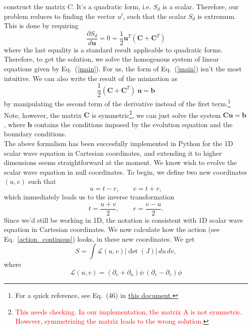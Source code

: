 \documentclass[nofootinbib,preprintnumbers,superscriptaddress,notitlepage]{revtex4-1}
\newcommand{\<}{\begin{equation}}
\newcommand{\?}{\end{equation}}
\begin{document}
construct the matrix $C$. It's a quadratic form, i.e. $S_d$ is a scalar.
Therefore, our problem reduces to finding the vector $u^l$, such that the
scalar $S_d$ is extremum. This is done by requiring
\begin{equation}
\label{main}
\dfrac{\partial S_d}{d\mathbf{u}} = 0 = \dfrac{1}{2}\mathbf{u}^T (\mathbf{C} + \mathbf{C}^T)
\end{equation}
where the last equality is a standard result applicable to quadratic forms.
Therefore, to get the solution, we solve the homogenous system of linear
equations given by Eq.~(\ref{main}). For us, the form of Eq.~(\ref{main})
isn't the most intuitive. We can also write the result of the minization as
\begin{equation}
\label{solve}
\dfrac{1}{2}(\mathbf{C} + \mathbf{C}^T)~\mathbf{u} = \mathbf{b} 
\end{equation}
by manipulating the second term of the derivative instead of the first
term.\footnote{For a quick reference, see Eq.~(46) in
\href{http://www.atmos.washington.edu/~dennis/MatrixCalculus.pdf}{this
document.}} Note, however, the matrix $\mathbf{C}$ is
symmetric\footnote{\textcolor{red}{This needs checking. In our implementation,
the matrix A is not symmetric. However, symmetrizing the matrix leads to the
wrong solution.}}, we can just solve the system $\mathbf{C}\mathbf{u} =
\mathbf{b}  $, where $\mathbf{b} $ contains the conditions imposed by the
evolution equation and the boundary conditions.\\

The above formalism has been succesfully implemented in Python for the 1D
scalar wave equation in Cartesian coordinates, and extending it to higher
dimensions seems straightforward at the moment. We know wish to evolve the 
scalar wave equation in null coordinates. To begin, we define two new coordinates 
$(u,v)$ such that
\begin{equation}
u = t - r, \qquad v = t + r,
\end{equation}
which immediately leads us to the inverse transformation
\begin{equation}
t = \dfrac{u + v}{2}, \qquad r = \dfrac{v - u}{2}.
\end{equation}
Since we'd still be working in 1D, the notation is consistent with 1D scalar
wave equation in Cartesian coordinates. We now calculate how the
action (see Eq.~\ref{action_continous}) looks, in these new coordinates. We get
\begin{equation}
S = \int \mathcal{L}(u,v) |\det(J)|\,du\,dv,
\end{equation}
where
\begin{equation}
\mathcal{L}(u,v) = ( \partial_v + \partial_u)\phi ~(\partial_v - \partial_v)\phi 
\end{equation}
\end{document}
